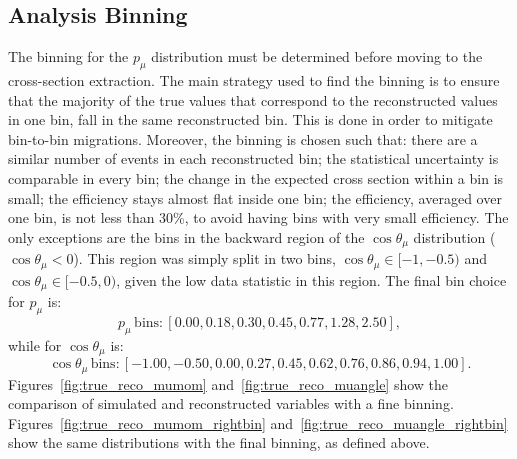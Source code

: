 \subsection{Analysis Binning}
\label{sec:binning}

The binning for the $p_\mu$ distribution must be determined before moving to the cross-section extraction.
The main strategy used to find the binning is to ensure that the majority of the true values that correspond to the reconstructed values in one bin, fall in the same reconstructed bin. This is done in order to mitigate bin-to-bin migrations. 
Moreover, the binning is chosen such that: there are a similar number of events in each reconstructed bin; the statistical uncertainty is comparable in every bin; the change in the expected cross section within a bin is small; the efficiency stays almost flat inside one bin; the efficiency, averaged over one bin, is not less than 30\%, to avoid having bins with very small efficiency.
The only exceptions are the bins in the backward region of the $\cos\theta_\mu$ distribution ($\cos\theta_\mu < 0$). This region was simply split in two bins, $\cos\theta_\mu \in [-1, -0.5)$ and $\cos\theta_\mu \in [-0.5, 0)$, given the low data statistic in this region.  
The final bin choice for $p_\mu$ is:
\begin{equation}
p_\mu \, \text{bins}: [0.00, 0.18, 0.30, 0.45, 0.77, 1.28, 2.50],
\end{equation}
while for $\cos\theta_\mu$ is:
\begin{equation}
\cos\theta_\mu \, \text{bins}: [-1.00, -0.50, 0.00, 0.27, 0.45, 0.62, 0.76, 0.86, 0.94, 1.00].
\end{equation}
Figures~\ref{fig:true_reco_mumom} and~\ref{fig:true_reco_muangle} show the comparison of simulated and reconstructed variables with a fine binning.
Figures~\ref{fig:true_reco_mumom_rightbin} and~\ref{fig:true_reco_muangle_rightbin} show the same distributions with the final binning, as defined above.

